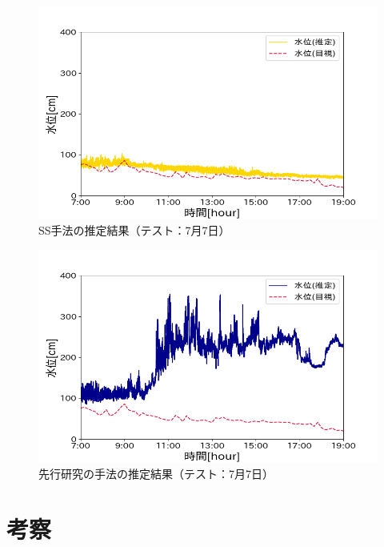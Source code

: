 \begin{figure}[h] 
  \begin{center}
    \includegraphics[width=\linewidth]{image/0707_ss.png}
  \end{center}
  \caption{SS手法の推定結果（テスト：7月7日）}
  \label{ss_0707}
\end{figure}

\begin{figure}[h] 
  \begin{center}
    \includegraphics[width=\linewidth]{image/0707_senkou.png}
  \end{center}
  \caption{先行研究の手法の推定結果（テスト：7月7日）}
  \label{senkou_0707}
\end{figure}

\clearpage
\section{考察}

